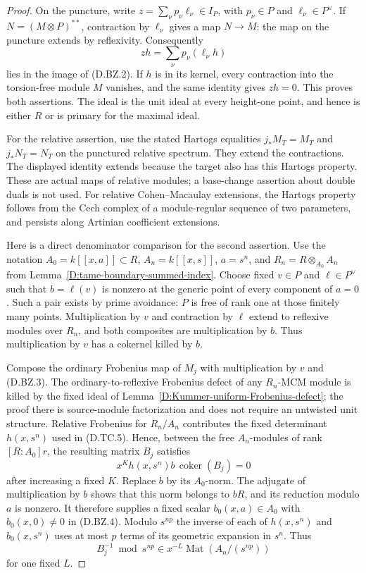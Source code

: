 \begin{proof}
On the puncture, write $z=\sum_\nu p_\nu\ell_\nu\in I_P$,
with $p_\nu\in P$ and $\ell_\nu\in P^\vee$.  If
$N=(M\otimes P)^{**}$, contraction by $\ell_\nu$ gives a map
$N\to M$: the map on the puncture extends by reflexivity.
Consequently
\[
             zh=\sum_\nu p_\nu(\ell_\nu h)
\]
lies in the image of (D.BZ.2).  If $h$ is in its kernel, every
contraction into the torsion-free module $M$ vanishes, and the
same identity gives $zh=0$.  This proves both assertions.
The ideal is the unit ideal at every height-one point, and hence
is either $R$ or is primary for the maximal ideal.

For the relative assertion, use the stated Hartogs equalities
$j_*M_T=M_T$ and $j_*N_T=N_T$ on the punctured relative spectrum.
They extend the contractions.  The displayed identity extends
because the target also has this Hartogs property.  These are
actual maps of relative modules; a base-change assertion about
double duals is not used.  For relative Cohen--Macaulay extensions,
the Hartogs property follows from the Cech complex of a module-regular
sequence of two parameters, and persists along Artinian coefficient
extensions.

Here is a direct denominator comparison for the second assertion.
Use the notation
$A_0=k[[x,a]]\subset R$, $A_n=k[[x,s]]$, $a=s^n$,
and $R_n=R\otimes_{A_0}A_n$ from
Lemma~\ref{D:tame-boundary-summed-index}.
Choose fixed $v\in P$ and $\ell\in P^\vee$ such that
$b=\ell(v)$ is nonzero at the generic point of every
component of $a=0$.  Such a pair exists by prime avoidance:
$P$ is free of rank one at those finitely many points.
Multiplication by $v$ and contraction by $\ell$ extend to
reflexive modules over $R_n$, and both composites are
multiplication by $b$.  Thus multiplication by $v$ has a
cokernel killed by $b$.

Compose the ordinary Frobenius map of $M_j$ with multiplication
by $v$ and (D.BZ.3).  The ordinary-to-reflexive Frobenius
defect of any $R_n$-MCM module is killed by the fixed ideal
of Lemma~\ref{D:Kummer-uniform-Frobenius-defect}; the proof
there is source-module factorization and does not require
an untwisted unit structure.  Relative Frobenius for $R_n/A_n$
contributes the fixed determinant $h(x,s^n)$ used in
(D.TC.5).  Hence, between the free $A_n$-modules of rank
$[R:A_0]r$, the resulting matrix $B_j$ satisfies
\[
 x^K h(x,s^n)b\,\operatorname{coker}(B_j)=0
                                                        \tag{D.BZ.4}
\]
after increasing a fixed $K$.  Replace $b$ by its
$A_0$-norm.  The adjugate of multiplication by $b$ shows
that this norm belongs to $bR$, and its reduction modulo
$a$ is nonzero.  It therefore supplies a fixed scalar
$b_0(x,a)\in A_0$ with $b_0(x,0)\ne0$ in (D.BZ.4).
Modulo $s^{np}$ the inverse of each of
$h(x,s^n)$ and $b_0(x,s^n)$ uses at most $p$ terms
of its geometric expansion in $s^n$.  Thus
\[
       B_j^{-1}\bmod s^{np}
            \in x^{-L}\operatorname{Mat}
                         (A_n/(s^{np}))
                                                        \tag{D.BZ.5}
\]
for one fixed $L$.


\end{proof}
